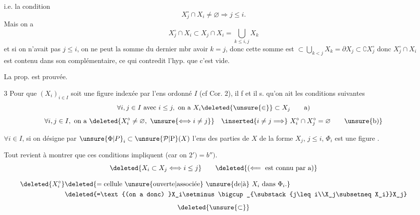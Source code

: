
i.e. la  condition
\[
X_j^\circ\cap X_i\ne\varnothing\Longrightarrow j\leq i.
\]
Mais on a
\[
X_j^\circ\cap X_i\subset X_j\cap X_i=\bigcup_{k\leq i,j}X_k
\]
et si on n'avait pas $j\leq i$, on ne peut  la somme du dernier mbr avoir $k=j$, donc cette somme est $\subset\bigcup_{k<j}X_k=\partial X_j\subset\complement X_j^\circ$  donc $X_j^\circ\cap X_i$ est contenu dans son complémentaire, ce qui contredit l'hyp. que c'est vide.

La prop. est prouvée.

 $3$ Pour que $(X_i)_{i\in I}$ soit une figure  indexée par l'ens ordonné $I$ (cf Cor. $2$), il f et il s. qu'on ait les conditions suivantes
\[
\forall i,j\in I\ \text{avec }i\leq j,\ \text{on a }X_i\deleted{\unsure{\in}}\subset X_j\tag*{a)}
\]
\[
\forall i,j\in I,\ \text{on a }\deleted{X_i^\circ\ne\varnothing,\ \unsure{\Longleftrightarrow i\ne j}}\quad\inserted{i\ne j\Longrightarrow}\ X_i^\circ\cap X_j^\circ=\varnothing\tag*{\unsure{b)}}
\]

 $\forall i\in I$, si on désigne par $\unsure{\Phi|P}_i\subset\unsure{\mathcal{P}|\mathrm{P}}(X)$ l'ens des parties de $X$ de la forme $X_j$, $j\leq i$, $\Phi_i$ est une figure .

 

Tout revient à montrer que ces conditions  impliquent   (car on     $2')=b'')$.
\[
\deleted{X_i\subset X_j\Longleftrightarrow i\leq j}\qquad\deleted{(\Longleftarrow\text{ est connu par a})}
\]


\[
\begin{aligned}
\deleted{X_i^\circ}&\deleted{=\text{cellule \unsure{ouverte|associée} \unsure{de|à} }X_i\text{ dans }\Phi_i.}\\
&\deleted{=\text{(on a donc) }X_i\setminus\bigcup_{\substack{j\leq i\\X_j\subsetneq X_i}}X_j}
\end{aligned}
\]
\[
\deleted{\unsure{\subset}}
\]
